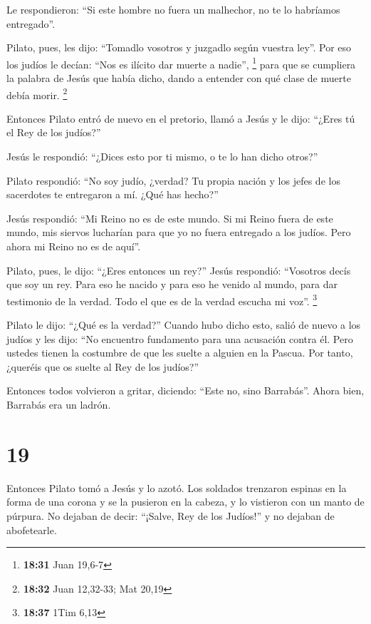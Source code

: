  Le respondieron: ``Si este hombre no fuera un malhechor,
no te lo habríamos entregado''.

 Pilato, pues, les dijo: ``Tomadlo vosotros y juzgadlo
según vuestra ley''. Por eso los judíos le decían: ``Nos es ilícito dar
muerte a nadie'', \footnote{\textbf{18:31} Juan 19,6-7} 
para que se cumpliera la palabra de Jesús que había dicho, dando a
entender con qué clase de muerte debía morir. \footnote{\textbf{18:32}
  Juan 12,32-33; Mat 20,19}

 Entonces Pilato entró de nuevo en el pretorio, llamó a
Jesús y le dijo: ``¿Eres tú el Rey de los judíos?''

 Jesús le respondió: ``¿Dices esto por ti mismo, o te lo
han dicho otros?''

 Pilato respondió: ``No soy judío, ¿verdad? Tu propia
nación y los jefes de los sacerdotes te entregaron a mí. ¿Qué has
hecho?''

 Jesús respondió: ``Mi Reino no es de este mundo. Si mi
Reino fuera de este mundo, mis siervos lucharían para que yo no fuera
entregado a los judíos. Pero ahora mi Reino no es de aquí''.

 Pilato, pues, le dijo: ``¿Eres entonces un rey?'' Jesús
respondió: ``Vosotros decís que soy un rey. Para eso he nacido y para
eso he venido al mundo, para dar testimonio de la verdad. Todo el que es
de la verdad escucha mi voz''. \footnote{\textbf{18:37} 1Tim 6,13}

 Pilato le dijo: ``¿Qué es la verdad?'' Cuando hubo dicho
esto, salió de nuevo a los judíos y les dijo: ``No encuentro fundamento
para una acusación contra él.  Pero ustedes tienen la
costumbre de que les suelte a alguien en la Pascua. Por tanto, ¿queréis
que os suelte al Rey de los judíos?''

 Entonces todos volvieron a gritar, diciendo: ``Este no,
sino Barrabás''. Ahora bien, Barrabás era un ladrón.

\hypertarget{section-18}{%
\section{19}\label{section-18}}

 Entonces Pilato tomó a Jesús y lo azotó. 
Los soldados trenzaron espinas en la forma de una corona y se la
pusieron en la cabeza, y lo vistieron con un manto de púrpura.
 No dejaban de decir: ``¡Salve, Rey de los Judíos!'' y no
dejaban de abofetearle.

